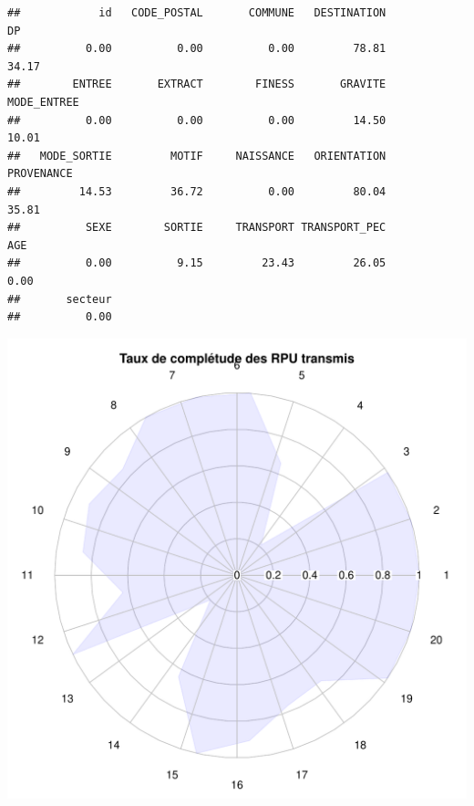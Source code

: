 \documentclass[12pt,english,french,twoside]{report}\usepackage[]{graphicx}\usepackage[]{color}
\makeatletter
\def\maxwidth{ %
  \ifdim\Gin@nat@width>\linewidth
    \linewidth
  \else
    \Gin@nat@width
  \fi
}
\newenvironment{kframe}{%
 \def\at@end@of@kframe{}%
 \ifinner\ifhmode%
  \def\at@end@of@kframe{\end{minipage}}%
  \begin{minipage}{\columnwidth}%
 \fi\fi%
 \def\FrameCommand##1{\hskip\@totalleftmargin \hskip-\fboxsep
 \colorbox{shadecolor}{##1}\hskip-\fboxsep
     \hskip-\linewidth \hskip-\@totalleftmargin \hskip\columnwidth}%
 \MakeFramed {\advance\hsize-\width
   \@totalleftmargin\z@ \linewidth\hsize
   \@setminipage}}%
 {\par\unskip\endMakeFramed%
 \at@end@of@kframe}
\newenvironment{knitrout}{}{} %
\makeatother
\begin{document}
\begin{knitrout}
\color{fgcolor}\begin{kframe}
\begin{verbatim}
##            id   CODE_POSTAL       COMMUNE   DESTINATION            DP 
##          0.00          0.00          0.00         78.81         34.17 
##        ENTREE       EXTRACT        FINESS       GRAVITE   MODE_ENTREE 
##          0.00          0.00          0.00         14.50         10.01 
##   MODE_SORTIE         MOTIF     NAISSANCE   ORIENTATION    PROVENANCE 
##         14.53         36.72          0.00         80.04         35.81 
##          SEXE        SORTIE     TRANSPORT TRANSPORT_PEC           AGE 
##          0.00          9.15         23.43         26.05          0.00 
##       secteur 
##          0.00
\end{verbatim}


{\ttfamily\noindent\color{warningcolor}{\#\# Warning: 'x' is NULL so the result will be NULL\\\#\# Warning: 'x' is NULL so the result will be NULL}}\end{kframe}
\includegraphics[width=\maxwidth]{figure/radar} 

\end{knitrout}
\end{document}
